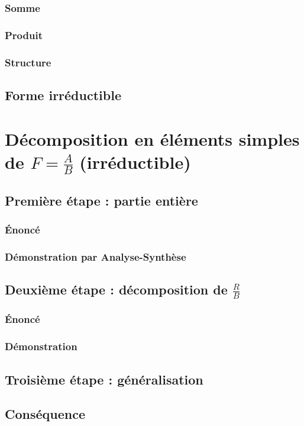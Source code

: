 \documentclass[12pt,a4paper,french]{book}
\begin{document}
			\subsubsection{Somme}
			\subsubsection{Produit}
			\subsubsection{Structure}
		\subsection{Forme irréductible}
	\section{Décomposition en éléments simples de $F = \frac{A}{B}$ (irréductible)}
		\subsection{Première étape : partie entière}
			\subsubsection{Énoncé}
			\subsubsection{Démonstration par Analyse-Synthèse}
		\subsection{Deuxième étape : décomposition de $\frac{R}{B}$}
			\subsubsection{Énoncé}
			\subsubsection{Démonstration}
		\subsection{Troisième étape : généralisation}
		\subsection{Conséquence}
\end{document}
